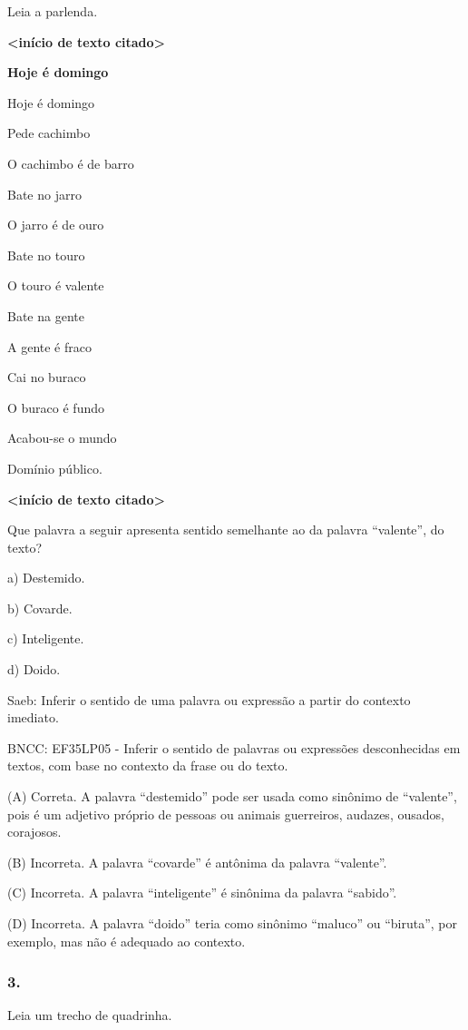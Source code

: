 Leia a parlenda.

\textbf{\textless{}início de texto citado\textgreater{}}

\textbf{Hoje é domingo}

Hoje é domingo

Pede cachimbo

O cachimbo é de barro

Bate no jarro

O jarro é de ouro

Bate no touro

O touro é valente

Bate na gente

A gente é fraco

Cai no buraco

O buraco é fundo

Acabou-se o mundo

Domínio público.

\textbf{\textless{}início de texto citado\textgreater{}}

Que palavra a seguir apresenta sentido semelhante ao da palavra
``valente'', do texto?

a) Destemido.

b) Covarde.

c) Inteligente.

d) Doido.

Saeb: Inferir o sentido de uma palavra ou expressão a partir do contexto
imediato.

BNCC: EF35LP05 - Inferir o sentido de palavras ou expressões
desconhecidas em textos, com base no contexto da frase ou do texto.

(A) Correta. A palavra ``destemido'' pode ser usada como sinônimo de
``valente'', pois é um adjetivo próprio de pessoas ou animais
guerreiros, audazes, ousados, corajosos.

(B) Incorreta. A palavra ``covarde'' é antônima da palavra ``valente''.

(C) Incorreta. A palavra ``inteligente'' é sinônima da palavra
``sabido''.

(D) Incorreta. A palavra ``doido'' teria como sinônimo ``maluco'' ou
``biruta'', por exemplo, mas não é adequado ao contexto.

\subsubsection{3. }\label{section-15}

Leia um trecho de quadrinha.

